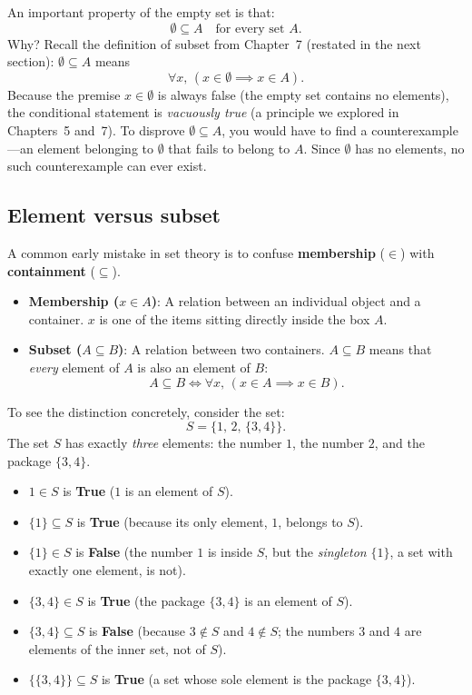 An important property of the empty set is that:
\[
\emptyset \subseteq A \quad \text{for every set } A.
\]
Why? Recall the definition of subset from Chapter~7 (restated in the next section): $\emptyset \subseteq A$ means
\[
\forall x, \, (x \in \emptyset \implies x \in A).
\]
Because the premise $x \in \emptyset$ is always false (the empty set contains no elements), the conditional statement is \emph{vacuously true} (a principle we explored in Chapters~5 and~7). To disprove $\emptyset \subseteq A$, you would have to find a counterexample---an element belonging to $\emptyset$ that fails to belong to $A$. Since $\emptyset$ has no elements, no such counterexample can ever exist.

\subsection{Element versus subset}

A common early mistake in set theory is to confuse \textbf{membership} ($\in$) with \textbf{containment} ($\subseteq$).

\begin{itemize}
\item \textbf{Membership ($x \in A$)}: A relation between an individual object and a container. $x$ is one of the items sitting directly inside the box $A$.
\item \textbf{Subset ($A \subseteq B$)}: A relation between two containers. $A \subseteq B$ means that \emph{every} element of $A$ is also an element of $B$:
\[
A \subseteq B \iff \forall x, \, (x \in A \implies x \in B).
\]
\end{itemize}

To see the distinction concretely, consider the set:
\[
S = \bigl\{1, \, 2, \, \{3, 4\}\bigr\}.
\]
The set $S$ has exactly \emph{three} elements: the number $1$, the number $2$, and the package $\{3, 4\}$.
\begin{itemize}
\item $1 \in S$ is \textbf{True} ($1$ is an element of $S$).
\item $\{1\} \subseteq S$ is \textbf{True} (because its only element, $1$, belongs to $S$).
\item $\{1\} \in S$ is \textbf{False} (the number $1$ is inside $S$, but the \emph{singleton} $\{1\}$, a set with exactly one element, is not).
\item $\{3, 4\} \in S$ is \textbf{True} (the package $\{3, 4\}$ is an element of $S$).
\item $\{3, 4\} \subseteq S$ is \textbf{False} (because $3 \notin S$ and $4 \notin S$; the numbers $3$ and $4$ are elements of the inner set, not of $S$).
\item $\bigl\{\{3, 4\}\bigr\} \subseteq S$ is \textbf{True} (a set whose sole element is the package $\{3, 4\}$).
\end{itemize}

